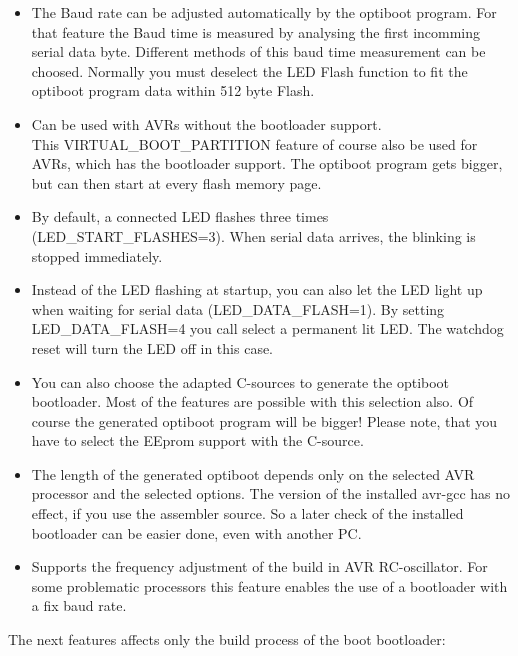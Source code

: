 \begin{itemize}
\item {The Baud rate can be adjusted automatically by the optiboot program.
	For that feature the Baud time is measured by analysing the first incomming serial data byte.
	Different methods of this baud time measurement can be choosed.
	Normally you must deselect the LED Flash function to fit
	the optiboot program data within 512 byte Flash.}

\item {Can be used with AVRs without the bootloader support.\\
        This VIRTUAL\_BOOT\_PARTITION feature of course also
	be used for AVRs, which has the bootloader support.
	The optiboot program  gets bigger, but can then start at every flash memory page.}

\item {By default, a connected LED flashes three times (LED\_START\_FLASHES=3).
	When serial data arrives, the blinking is stopped immediately.}

\item {Instead of the LED flashing at startup, you can also let the LED light up when waiting
	for serial data (LED\_DATA\_FLASH=1).
       By setting LED\_DATA\_FLASH=4 you call select a permanent lit LED.
		The watchdog reset will turn the LED off in this case.}

\item {You can also choose the adapted C-sources to generate the optiboot bootloader.
	Most of the features are possible with this selection also.
	Of course the generated optiboot program will be bigger!
	Please note, that you have to select the EEprom support with the C-source.}

\item {The length of the generated optiboot depends only on the selected AVR processor and the selected options.
	The version of the installed avr-gcc has no effect, if you use the assembler source.
	So a later check of the installed bootloader can be easier done,
	even with another PC.}

\item {Supports the frequency adjustment of the build in AVR RC-oscillator.
	For some problematic processors this feature enables the use of a
	bootloader with a fix baud rate.}

\end{itemize}

The next features affects only the build process of the boot bootloader:

